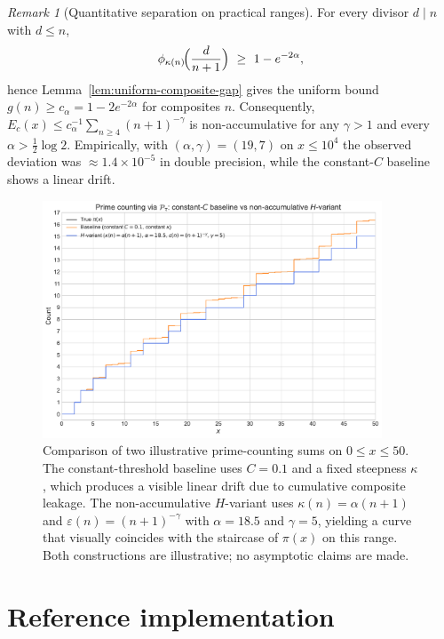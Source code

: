 \documentclass[11pt,a4paper]{amsart}
\theoremstyle{plain}
\theoremstyle{definition}
\theoremstyle{remark}
\newtheorem{remark}[theorem]{Remark}
\begin{document}
\begin{remark}[Quantitative separation on practical ranges]
For every divisor $d\mid n$ with $d\le n$,
\[
\phi_{\kappa(n)}\!\Bigl(\frac{d}{n+1}\Bigr)\ \ge\ 1-e^{-2\alpha},
\]
hence Lemma~\ref{lem:uniform-composite-gap} gives the uniform bound
$g(n)\ge c_\alpha=1-2e^{-2\alpha}$ for composites $n$. Consequently,
$E_c(x)\le c_\alpha^{-1}\sum_{n\ge 4}(n+1)^{-\gamma}$ is non-accumulative for any $\gamma>1$ and every $\alpha>\tfrac12\log 2$.
Empirically, with $(\alpha,\gamma)=(19,7)$ on $x\le 10^4$ the observed deviation was $\approx 1.4\times 10^{-5}$ in double precision, while the constant-$C$ baseline shows a linear drift.
\end{remark}

\begin{figure}[!htbp]
\centering
\includegraphics[width=0.9\textwidth]{plot_prime_counting.pdf}
\caption{Comparison of two illustrative prime-counting sums on $0\le x\le 50$. The constant-threshold baseline uses $C=0.1$ and a fixed steepness $\kappa$, which produces a visible linear drift due to cumulative composite leakage. The non-accumulative $H$-variant uses $\kappa(n)=\alpha(n+1)$ and $\varepsilon(n)=(n+1)^{-\gamma}$ with $\alpha=18.5$ and $\gamma=5$, yielding a curve that visually coincides with the staircase of $\pi(x)$ on this range. Both constructions are illustrative; no asymptotic claims are made.}
\label{fig:primecounting}
\end{figure}
\FloatBarrier


\section{Reference implementation}\label{app:code}
\end{document}
